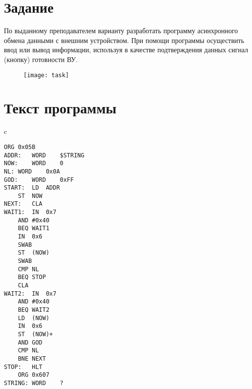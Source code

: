 \tableofcontents

\newpage

\section{Задание}
По выданному преподавателем варианту разработать программу асинхронного обмена данными с внешним устройством. При помощи программы осуществить ввод или вывод информации, используя в качестве подтверждения данных сигнал (кнопку) готовности ВУ.
\begin{figure}[H]
\centering
\texttt{[image: task]}
\label{pic:task}
\end{figure}

\section{Текст программы}
\begin{center}
\begin{tabular}{c}
\begin{lstlisting}[basicstyle=\ttfamily]
	ORG	0x05B
ADDR:	WORD	$STRING
NOW:	WORD	0
NL:	WORD	0x0A
GOD:	WORD	0xFF
START:	LD	ADDR
	ST	NOW
NEXT:	CLA
WAIT1:	IN	0x7
	AND	#0x40
	BEQ	WAIT1
	IN	0x6
	SWAB
	ST	(NOW)
	SWAB
	CMP	NL
	BEQ	STOP
	CLA
WAIT2:	IN	0x7
	AND	#0x40
	BEQ	WAIT2
	LD	(NOW)
	IN	0x6
	ST	(NOW)+
	AND	GOD
	CMP	NL
	BNE	NEXT
STOP:	HLT
	ORG	0x607
STRING:	WORD	?
\end{lstlisting}
\end{tabular}
\end{center}

